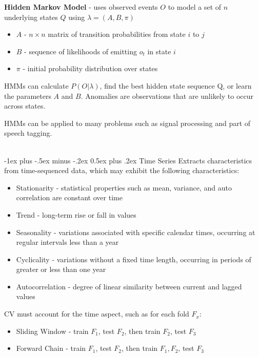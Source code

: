 \documentclass[10pt,landscape]{article}
\makeatletter
\renewcommand{\section}{\@startsection{section}{1}{0mm}%
                                {-1ex plus -.5ex minus -.2ex}%
                                {0.5ex plus .2ex}%
                                {\normalfont\large\bfseries}}
\makeatother
\begin{document}
\begin{multicols}{3}
\textbf{Hidden Markov Model} - uses observed events $O$ to model a set of $n$ underlying states $Q$ using $\lambda = (A,B,\pi)$
\begin{itemize}[label={--},leftmargin=4mm]
\itemsep -.4mm
\item $A$ - $n\times n$ matrix of transition probabilities from state $i$ to $j$ \item $B$ - sequence of likelihoods of emitting $o_t$ in state $i$
\item $\pi$ - initial probability distribution over states
\end{itemize}
HMMs can calculate $P(O|\lambda)$, find the best hidden state sequence Q, or learn the parameters $A$ and $B$.
Anomalies are observations that are unlikely to occur across states.

\smallskip
HMMs can be applied to many problems such as signal processing and part of speech tagging.

\newpage
\textcolor{white}{.}\vspace{-5mm}\\ %
\section{Time Series}
Extracts characteristics from time-sequenced data, which may exhibit the following characteristics:
\begin{itemize}[label={--},leftmargin=4mm]
\itemsep -.4mm
\item Stationarity - statistical properties such as mean, variance, and auto correlation are constant over time
\item Trend - long-term rise or fall in values
\item Seasonality - variations associated with specific calendar times, occurring at regular intervals less than a year
\item Cyclicality - variations without a fixed time length, occurring in periods of greater or less than one year
\item Autocorrelation - degree of linear similarity between current and lagged values
\end{itemize}


CV must account for the time aspect, such as for each fold $F_x$:
\begin{itemize}[label={--},leftmargin=4mm]
\itemsep -.4mm
\item Sliding Window - train $F_1$, test $F_2$, then train $F_2$, test $F_3$
\item Forward Chain - train $F_1$, test $F_2$, then train $F_1, F_2$, test $F_3$
\end{itemize}


\end{multicols}
\end{document}
